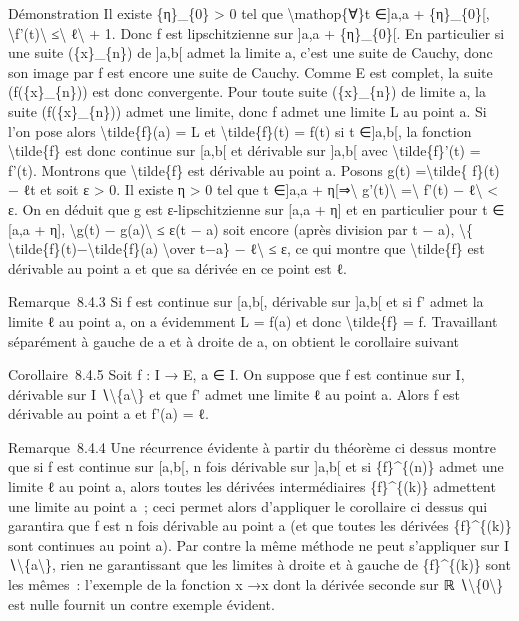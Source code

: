 \documentclass[]{article}
\begin{document}
Démonstration Il existe \{η\}\_\{0\} \textgreater{} 0 tel que
\textbackslash{}mathop\{∀\}t ∈{]}a,a + \{η\}\_\{0\}{[},
\textbackslash{}\textbar{}f'(t)\textbackslash{}\textbar{}
≤\textbackslash{}\textbar{} ℓ\textbackslash{}\textbar{} + 1. Donc f est
lipschitzienne sur {]}a,a + \{η\}\_\{0\}{[}. En particulier si une suite
(\{x\}\_\{n\}) de {]}a,b{[} admet la limite a, c'est une suite de
Cauchy, donc son image par f est encore une suite de Cauchy. Comme E est
complet, la suite (f(\{x\}\_\{n\})) est donc convergente. Pour toute
suite (\{x\}\_\{n\}) de limite a, la suite (f(\{x\}\_\{n\})) admet une
limite, donc f admet une limite L au point a. Si l'on pose alors
\textbackslash{}tilde\{f\}(a) = L et \textbackslash{}tilde\{f\}(t) =
f(t) si t ∈{]}a,b{[}, la fonction \textbackslash{}tilde\{f\} est donc
continue sur {[}a,b{[} et dérivable sur {]}a,b{[} avec
\textbackslash{}tilde\{f\}'(t) = f'(t). Montrons que
\textbackslash{}tilde\{f\} est dérivable au point a. Posons g(t)
=\textbackslash{}tilde\{ f\}(t) − ℓt et soit ε \textgreater{} 0. Il
existe η \textgreater{} 0 tel que t ∈{]}a,a +
η{[}⇒\textbackslash{}\textbar{} g'(t)\textbackslash{}\textbar{}
=\textbackslash{}\textbar{} f'(t) − ℓ\textbackslash{}\textbar{}
\textless{} ε. On en déduit que g est ε-lipschitzienne sur {[}a,a + η{]}
et en particulier pour t ∈ {[}a,a + η{]}, \textbackslash{}\textbar{}g(t)
− g(a)\textbackslash{}\textbar{} ≤ ε(t − a) soit encore (après division
par t − a), \textbackslash{}\textbar{}\{
\textbackslash{}tilde\{f\}(t)−\textbackslash{}tilde\{f\}(a)
\textbackslash{}over t−a\} − ℓ\textbackslash{}\textbar{} ≤ ε, ce qui
montre que \textbackslash{}tilde\{f\} est dérivable au point a et que sa
dérivée en ce point est ℓ.

Remarque~8.4.3 Si f est continue sur {[}a,b{[}, dérivable sur {]}a,b{[}
et si f' admet la limite ℓ au point a, on a évidemment L = f(a) et donc
\textbackslash{}tilde\{f\} = f. Travaillant séparément à gauche de a et
à droite de a, on obtient le corollaire suivant

Corollaire~8.4.5 Soit f : I → E, a ∈ I. On suppose que f est continue
sur I, dérivable sur I ∖\textbackslash{}\{a\textbackslash{}\} et que f'
admet une limite ℓ au point a. Alors f est dérivable au point a et f'(a)
= ℓ.

Remarque~8.4.4 Une récurrence évidente à partir du théorème ci dessus
montre que si f est continue sur {[}a,b{[}, n fois dérivable sur
{]}a,b{[} et si \{f\}\^{}\{(n)\} admet une limite ℓ au point a, alors
toutes les dérivées intermédiaires \{f\}\^{}\{(k)\} admettent une limite
au point a~; ceci permet alors d'appliquer le corollaire ci dessus qui
garantira que f est n fois dérivable au point a (et que toutes les
dérivées \{f\}\^{}\{(k)\} sont continues au point a). Par contre la même
méthode ne peut s'appliquer sur I
∖\textbackslash{}\{a\textbackslash{}\}, rien ne garantissant que les
limites à droite et à gauche de \{f\}\^{}\{(k)\} sont les mêmes~:
l'exemple de la fonction x →\textbar{}x\textbar{} dont la dérivée
seconde sur ℝ ∖\textbackslash{}\{0\textbackslash{}\} est nulle fournit
un contre exemple évident.
\end{document}
